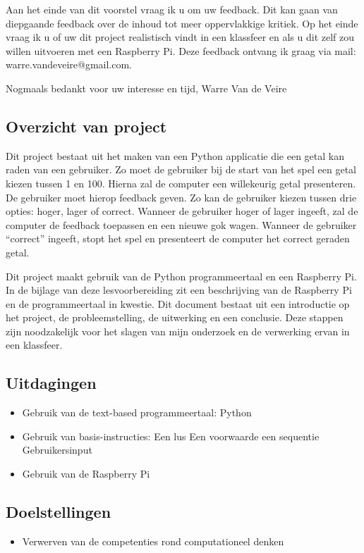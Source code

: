 Aan het einde van dit voorstel vraag ik u om uw feedback. Dit kan gaan van diepgaande feedback over de inhoud tot meer oppervlakkige kritiek. Op het einde vraag ik u of uw dit project realistisch vindt in een klassfeer en als u dit zelf zou willen uitvoeren met een Raspberry Pi. Deze feedback ontvang ik graag via mail: warre.vandeveire@gmail.com.

Nogmaals bedankt voor uw interesse en tijd,
Warre Van de Veire

\subsection{Overzicht van project}
Dit project bestaat uit het maken van een Python applicatie die een getal kan raden van een gebruiker. 
Zo moet de gebruiker bij de start van het spel een getal kiezen tussen 1 en 100. Hierna zal de computer een willekeurig getal presenteren. De gebruiker moet hierop feedback geven. Zo kan de gebruiker kiezen tussen drie opties: hoger, lager of correct. Wanneer de gebruiker hoger of lager ingeeft, zal de computer de feedback toepassen en een nieuwe gok wagen. Wanneer de gebruiker “correct” ingeeft, stopt het spel en presenteert de computer het correct geraden getal.

Dit project maakt gebruik van de Python programmeertaal en een Raspberry Pi. In de bijlage van deze lesvoorbereiding zit een beschrijving van de Raspberry Pi en de programmeertaal in kwestie. 
Dit document bestaat uit een introductie op het project, de probleemstelling, de uitwerking en een conclusie. Deze stappen zijn noodzakelijk voor het slagen van mijn onderzoek en de verwerking ervan in een klassfeer. 

\subsection{Uitdagingen}
\begin{itemize}
    \item Gebruik van de text-based programmeertaal: Python
    \item Gebruik van basis-instructies:
    \subitem Een lus
    \subitem Een voorwaarde
    \subitem een sequentie
    \subitem Gebruikersinput
    \item Gebruik van de Raspberry Pi
\end{itemize}

\subsection{Doelstellingen}
\begin{itemize}
    \item Verwerven van de competenties rond computationeel denken
\end{itemize}

